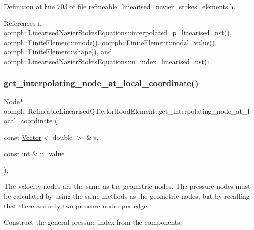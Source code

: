 Definition at line 703 of file refineable\+\_\+linearised\+\_\+navier\+\_\+stokes\+\_\+elements.\+h.



References i, oomph\+::\+Linearised\+Navier\+Stokes\+Equations\+::interpolated\+\_\+p\+\_\+linearised\+\_\+nst(), oomph\+::\+Finite\+Element\+::nnode(), oomph\+::\+Finite\+Element\+::nodal\+\_\+value(), oomph\+::\+Finite\+Element\+::shape(), and oomph\+::\+Linearised\+Navier\+Stokes\+Equations\+::u\+\_\+index\+\_\+linearised\+\_\+nst().

\mbox{\label{classoomph_1_1RefineableLinearisedQTaylorHoodElement_a3ca81c787638e7e8a66d123f7c52feb7}} 
\subsubsection{\texorpdfstring{get\+\_\+interpolating\+\_\+node\+\_\+at\+\_\+local\+\_\+coordinate()}{get\_interpolating\_node\_at\_local\_coordinate()}}
{\footnotesize\ttfamily \hyperlink{classoomph_1_1Node}{Node}$\ast$ oomph\+::\+Refineable\+Linearised\+Q\+Taylor\+Hood\+Element\+::get\+\_\+interpolating\+\_\+node\+\_\+at\+\_\+local\+\_\+coordinate (\begin{DoxyParamCaption}\item[{const \hyperlink{classoomph_1_1Vector}{Vector}$<$ double $>$ \&}]{s,  }\item[{const int \&}]{n\+\_\+value }\end{DoxyParamCaption})\hspace{0.3cm}{\ttfamily [inline]}, {\ttfamily [virtual]}}



The velocity nodes are the same as the geometric nodes. The pressure nodes must be calculated by using the same methods as the geometric nodes, but by recalling that there are only two pressure nodes per edge. 

Construct the general pressure index from the components. 


